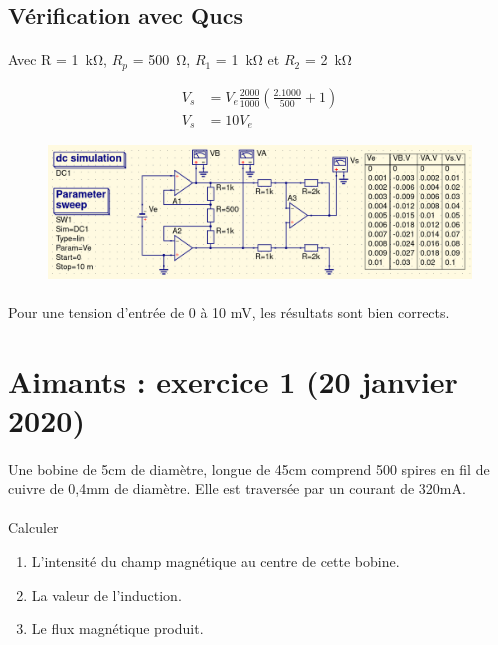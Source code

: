 \documentclass{article}
\begin{document}
\subsection{Vérification avec Qucs}
\paragraph{}
Avec R = \SI{1}{\kilo\ohm}, $R_p$ = \SI{500}{\ohm}, $R_1$ = \SI{1}{\kilo\ohm} et $R_2$ = \SI{2}{\kilo\ohm}

\begin{align*}
    V_s &= V_e\frac{2000}{1000}\left(\frac{2.1000}{500} + 1\right)\\
    V_s &= 10V_e
\end{align*}

\begin{figure}[H]
    \centering
    \includegraphics[width=\linewidth]{./images/AOP3-res.png}
\end{figure}

\paragraph{}
Pour une tension d'entrée de 0 à 10 mV, les résultats sont bien corrects.


\newpage
\section{Aimants : exercice 1 (20 janvier 2020)}
\paragraph{}
Une bobine de 5cm de diamètre, longue de 45cm comprend 500 spires en fil de cuivre de 0,4mm de diamètre. Elle est traversée par un courant de 320mA.

\paragraph{}
Calculer
\begin{enumerate}
    \item L'intensité du champ magnétique au centre de cette bobine.
    \item La valeur de l'induction.
    \item Le flux magnétique produit.
\end{enumerate}
\end{document}

